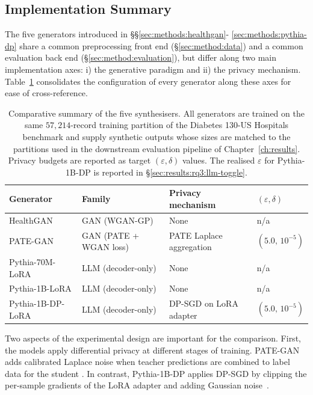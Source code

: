 \subsection{Implementation Summary}
\label{sec:methods:summary}

The five generators introduced in \S\S\ref{sec:methods:healthgan}-%
\ref{sec:methods:pythia-dp} share a common preprocessing front end
(\S\ref{sec:method:data}) and a common evaluation back end
(\S\ref{sec:method:evaluation}), but differ along two main
implementation axes: i) the generative paradigm and ii) the privacy mechanism.
Table~\ref{tab:methods-implementation-summary} consolidates the
configuration of every generator along these axes for ease of
cross-reference.

\begin{table}[h]
\centering
\footnotesize
\caption{Comparative summary of the five synthesisers. All generators
are trained on the same $57{,}214$-record training partition of the
Diabetes 130-US Hospitals benchmark and supply synthetic outputs whose
sizes are matched to the partitions used in the downstream evaluation
pipeline of Chapter~\ref{ch:results}. Privacy budgets are reported as
target $(\varepsilon, \delta)$ values. The realised $\varepsilon$ for
Pythia-1B-DP is reported in \S\ref{sec:results:rq3:llm-toggle}.}
\label{tab:methods-implementation-summary}
\begin{tabular}{llll}
\toprule
Generator & Family & Privacy mechanism & $(\varepsilon, \delta)$ \\
\midrule
HealthGAN
  & GAN (WGAN-GP)
  & None
  & n/a \\
PATE-GAN
  & GAN (PATE + WGAN loss)
  & PATE Laplace aggregation
  & $(5.0,\,10^{-5})$ \\
Pythia-70M-LoRA
  & LLM (decoder-only)
  & None
  & n/a \\
Pythia-1B-LoRA
  & LLM (decoder-only)
  & None
  & n/a \\
Pythia-1B-DP-LoRA
  & LLM (decoder-only)
  & DP-SGD on LoRA adapter
  & $(5.0,\,10^{-5})$ \\
\bottomrule
\end{tabular}
\end{table}

Two aspects of the experimental design are important for the comparison.
First, the models apply differential privacy at different stages of training.
PATE-GAN adds calibrated Laplace noise when teacher predictions are combined
to label data for the student
\cite{pategan,Papernot2017PATE}. In contrast, Pythia-1B-DP applies DP-SGD
by clipping the per-sample gradients of the LoRA adapter and adding Gaussian
noise~\cite{Abadi2016DPSGD,Yu2022DPFT}.

